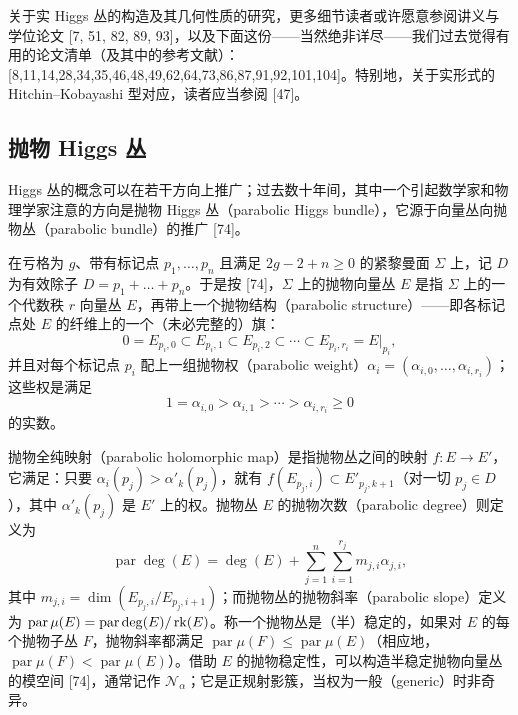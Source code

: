 
关于实 Higgs 丛的构造及其几何性质的研究，更多细节读者或许愿意参阅讲义与学位论文 [7, 51, 82, 89, 93]，以及下面这份——当然绝非详尽——我们过去觉得有用的论文清单（及其中的参考文献）：[8,11,14,28,34,35,46,48,49,62,64,73,86,87,91,92,101,104]。特别地，关于实形式的 Hitchin--Kobayashi 型对应，读者应当参阅 [47]。

\subsection{抛物 Higgs 丛}

Higgs 丛的概念可以在若干方向上推广；过去数十年间，其中一个引起数学家和物理学家注意的方向是抛物 Higgs 丛（parabolic Higgs bundle），它源于向量丛向抛物丛（parabolic bundle）的推广 [74]。

在亏格为 $g$、带有标记点 $p_1,\dots,p_n$ 且满足 $2g-2+n\ge 0$ 的紧黎曼面 $\Sigma$ 上，记 $D$ 为有效除子 $D=p_1+\dots+p_n$。于是按 [74]，$\Sigma$ 上的抛物向量丛 $E$ 是指 $\Sigma$ 上的一个代数秩 $r$ 向量丛 $E$，再带上一个抛物结构（parabolic structure）——即各标记点处 $E$ 的纤维上的一个（未必完整的）旗：
\[
0=E_{p_i,0}\subset E_{p_i,1}\subset E_{p_i,2}\subset\cdots\subset E_{p_i,r_i}=E|_{p_i},
\]
并且对每个标记点 $p_i$ 配上一组抛物权（parabolic weight）$\alpha_i=(\alpha_{i,0},\dots,\alpha_{i,r_i})$；这些权是满足
\[
1=\alpha_{i,0}>\alpha_{i,1}>\cdots>\alpha_{i,r_i}\ge 0
\]
的实数。


抛物全纯映射（parabolic holomorphic map）是指抛物丛之间的映射 $f: E\to E'$，它满足：只要 $\alpha_i(p_j)>\alpha'_k(p_j)$，就有 $f(E_{p_j,i})\subset E'_{p_j,k+1}$（对一切 $p_j\in D$），其中 $\alpha'_k(p_j)$ 是 $E'$ 上的权。抛物丛 $E$ 的抛物次数（parabolic degree）则定义为
\[
\operatorname{par}\deg(E)=\deg(E)+\sum_{j=1}^{n}\sum_{i=1}^{r_j}m_{j,i}\alpha_{j,i},
\]
其中 $m_{j,i}=\dim(E_{p_j,i}/E_{p_j,i+1})$；而抛物丛的抛物斜率（parabolic slope）定义为 $\operatorname{par}\mu(E)=\operatorname{par}\deg(E)/\operatorname{rk}(E)$。称一个抛物丛是（半）稳定的，如果对 $E$ 的每个抛物子丛 $F$，抛物斜率都满足 $\operatorname{par}\mu(F)\le\operatorname{par}\mu(E)$（相应地，$\operatorname{par}\mu(F)<\operatorname{par}\mu(E)$）。借助 $E$ 的抛物稳定性，可以构造半稳定抛物向量丛的模空间 [74]，通常记作 $\mathcal{N}_{\alpha}$；它是正规射影簇，当权为一般（generic）时非奇异。

